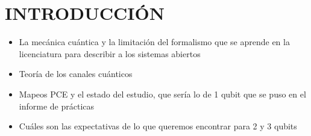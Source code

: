 \chapter{INTRODUCCIÓN}
\textcolor{mycolor}{
\begin{itemize}
\item La mecánica cuántica y la limitación del formalismo que se 
aprende en la licenciatura para describir a los sistemas abiertos
\item Teoría de los canales cuánticos
\item Mapeos PCE y el estado del estudio, que sería lo de 1
qubit que se puso en el informe de prácticas
\item Cuáles son las expectativas de lo que queremos encontrar 
para 2 y 3 qubits
\end{itemize}
}